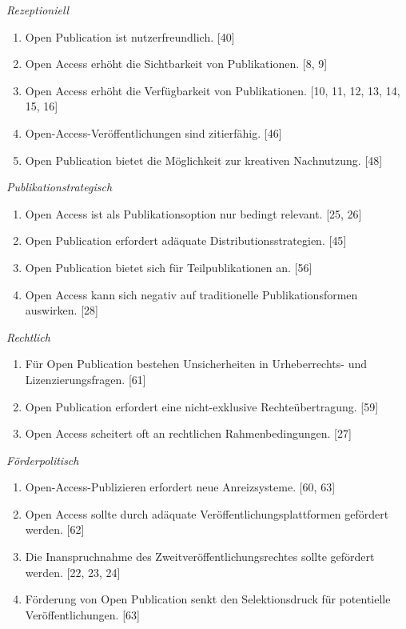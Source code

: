 \documentclass[a4paper,
fontsize=11pt,
oneside,
numbers=noperiodatend,
parskip=half-,
bibliography=totoc,
final
]{scrartcl}
\begin{document}
\emph{Rezeptioniell}

\begin{enumerate}
\def\labelenumi{(\arabic{enumi})}
\item
  Open Publication ist nutzerfreundlich. {[}40{]}
\item
  Open Access erhöht die Sichtbarkeit von Publikationen. {[}8, 9{]}
\item
  Open Access erhöht die Verfügbarkeit von Publikationen. {[}10, 11, 12, 13, 14, 15, 16{]}
\item
  Open-Access-Veröffentlichungen sind zitierfähig. {[}46{]}
\item
  Open Publication bietet die Möglichkeit zur kreativen Nachnutzung. {[}48{]}
\end{enumerate}

\emph{Publikationstrategisch}

\begin{enumerate}
\def\labelenumi{(\arabic{enumi})}
\item
  Open Access ist als Publikationsoption nur bedingt relevant. {[}25, 26{]}
\item
  Open Publication erfordert adäquate Distributionsstrategien. {[}45{]}
\item
  Open Publication bietet sich für Teilpublikationen an. {[}56{]}
\item
  Open Access kann sich negativ auf traditionelle Publikationsformen auswirken. {[}28{]}
\end{enumerate}

\emph{Rechtlich}

\begin{enumerate}
\def\labelenumi{(\arabic{enumi})}
\item
  Für Open Publication bestehen Unsicherheiten in Urheberrechts- und Lizenzierungsfragen. {[}61{]}
\item
  Open Publication erfordert eine nicht-exklusive Rechteübertragung. {[}59{]}
\item
  Open Access scheitert oft an rechtlichen Rahmenbedingungen. {[}27{]}
\end{enumerate}

\emph{Förderpolitisch}

\begin{enumerate}
\def\labelenumi{(\arabic{enumi})}
\item
  Open-Access-Publizieren erfordert neue Anreizsysteme. {[}60, 63{]}
\item
  Open Access sollte durch adäquate Veröffentlichungsplattformen gefördert werden. {[}62{]}
\item
  Die Inanspruchnahme des Zweitveröffentlichungsrechtes sollte gefördert werden. {[}22, 23, 24{]}
\item
  Förderung von Open Publication senkt den Selektionsdruck für potentielle Veröffentlichungen. {[}63{]}
\end{enumerate}
\end{document}
